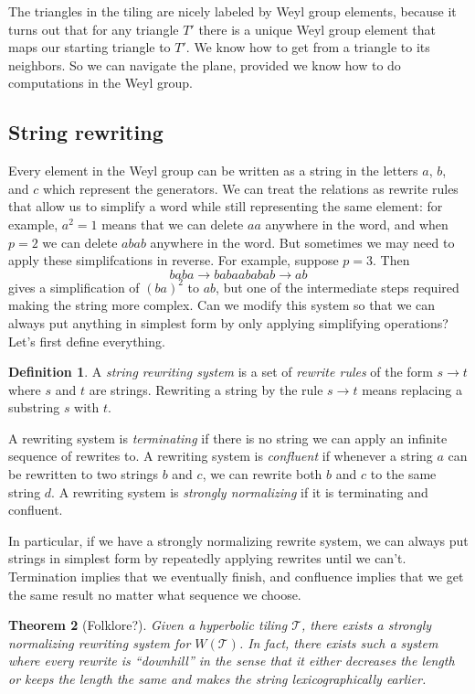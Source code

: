 \documentclass{article}
\newtheorem{thm}{Theorem}
\theoremstyle{definition}
\newtheorem{defn}[thm]{Definition}
\theoremstyle{remark}
\begin{document}
The triangles in the tiling are nicely labeled by Weyl group elements, because it turns out that for any triangle $T'$ there is a unique Weyl group element that maps our starting triangle to $T'$. We know how to get from a triangle to its neighbors. So we can navigate the plane, provided we know how to do computations in the Weyl group.

\subsection{String rewriting}
Every element in the Weyl group can be written as a string in the letters $a$, $b$, and $c$ which represent the generators. We can treat the relations as rewrite rules that allow us to simplify a word while still representing the same element: for example, $a^2=1$ means that we can delete $aa$ anywhere in the word, and when $p=2$ we can delete $abab$ anywhere in the word. But sometimes we may need to apply these simplifcations in reverse. For example, suppose $p=3$. Then
\[baba\to babaababab\to ab\]
gives a simplification of $(ba)^2$ to $ab$, but one of the intermediate steps required making the string more complex. Can we modify this system so that we can always put anything in simplest form by only applying simplifying operations? Let's first define everything.

\begin{defn}
    A \emph{string rewriting system} is a set of \emph{rewrite rules} of the form $s\to t$ where $s$ and $t$ are strings. Rewriting a string by the rule $s\to t$ means replacing a substring $s$ with $t$.

    A rewriting system is \emph{terminating} if there is no string we can apply an infinite sequence of rewrites to. A rewriting system is \emph{confluent} if whenever a string $a$ can be rewritten to two strings $b$ and $c$, we can rewrite both $b$ and $c$ to the same string $d$. A rewriting system is \emph{strongly normalizing} if it is terminating and confluent.
\end{defn}

In particular, if we have a strongly normalizing rewrite system, we can always put strings in simplest form by repeatedly applying rewrites until we can't. Termination implies that we eventually finish, and confluence implies that we get the same result no matter what sequence we choose.

\begin{thm}[Folklore?]
    Given a hyperbolic tiling $\mathcal T$, there exists a strongly normalizing rewriting system for $W(\mathcal T)$. In fact, there exists such a system where every rewrite is ``downhill'' in the sense that it either decreases the length or keeps the length the same and makes the string lexicographically earlier.
\end{thm}
\end{document}

